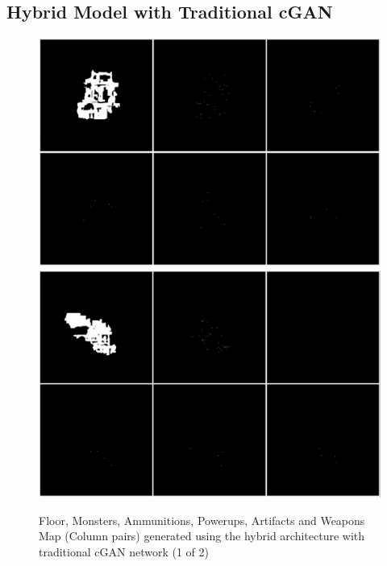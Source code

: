 \documentclass{Configuration_Files/PoliMi3i_thesis}
\begin{document}
\subsection{Hybrid Model with Traditional cGAN}
\begin{figure}[H]
    \centering
    \includegraphics[width=1\textwidth]{trad_cgan_sample1.jpg}
    \includegraphics[width=1\textwidth]{trad_cgan_sample2.jpg}
    \caption[Samples generated using the traditional cGAN network (1 of 2)]{Floor, Monsters, Ammunitions, Powerups, Artifacts and Weapons Map 
(Column pairs) generated using the hybrid architecture with traditional cGAN network (1 of 2)}
    \label{fig:tradcgansample1}
\end{figure}
\end{document}
